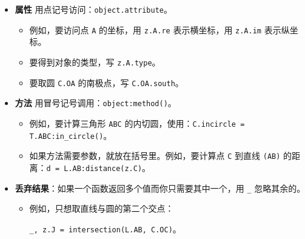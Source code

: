 \begin{itemize}
  \item \textbf{属性} 用点记号访问：\verb|object.attribute|。
    \begin{itemize}
      \item 例如，要访问点 \verb|A| 的坐标，用 \verb|z.A.re| 表示横坐标，用 \verb|z.A.im| 表示纵坐标。
      \item 要得到对象的类型，写 \verb|z.A.type|。
      \item 要取圆 \verb|C.OA| 的南极点，写 \verb|C.OA.south|。
    \end{itemize}

  \item \textbf{方法} 用冒号记号调用：\verb|object:method()|。
    \begin{itemize}
      \item 例如，要计算三角形 \verb|ABC| 的内切圆，使用：\verb|C.incircle = T.ABC:in_circle()|。
      \item 如果方法需要参数，就放在括号里。例如，要计算点 \verb|C| 到直线 \verb|(AB)| 的距离：\verb|d = L.AB:distance(z.C)|。
    \end{itemize}

  \item \textbf{丢弃结果}：如果一个函数返回多个值而你只需要其中一个，用 \verb|_| 忽略其余的。
    \begin{itemize}
      \item 例如，只想取直线与圆的第二个交点：

      \verb|_, z.J = intersection(L.AB, C.OC)|。
    \end{itemize}
\end{itemize}

